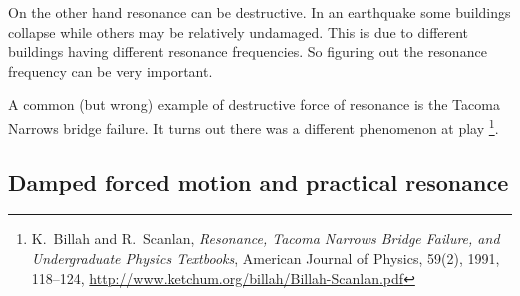 \documentclass[12pt]{book}
\begin{document}
On the other hand resonance can be destructive.
In an earthquake some buildings collapse while
others may be relatively undamaged.  This is due to different buildings
having different resonance frequencies.  So figuring out the resonance
frequency can be very important.

A common (but wrong) example of destructive force of resonance is the Tacoma
Narrows bridge failure.  It turns out there was a different
phenomenon at play%
\footnote{K.\ Billah and R.\ Scanlan, \emph{Resonance, Tacoma Narrows
Bridge Failure, and Undergraduate Physics Textbooks}, American Journal of
Physics, 59(2), 1991, 118--124,
\url{http://www.ketchum.org/billah/Billah-Scanlan.pdf}}.

\subsection{Damped forced motion and practical resonance}
\end{document}
